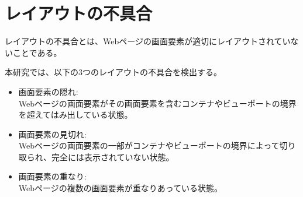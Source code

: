 \section{レイアウトの不具合}\label{sec:layout effect}
レイアウトの不具合とは、Webページの画面要素が適切にレイアウトされていないことである\cite{LayoutFailureDetection}。
\par
本研究では、以下の3つのレイアウトの不具合を検出する。
\begin{itemize}
      \setlength{\itemsep}{0pt}
            \setlength{\parsep}{0pt}
      \item 画面要素の隠れ:\\
            Webページの画面要素がその画面要素を含むコンテナやビューポートの境界を超えてはみ出している状態。
      \item 画面要素の見切れ:\\
            Webページの画面要素の一部がコンテナやビューポートの境界によって切り取られ、完全には表示されていない状態。
      \item 画面要素の重なり:\\
            Webページの複数の画面要素が重なりあっている状態。
\end{itemize}

